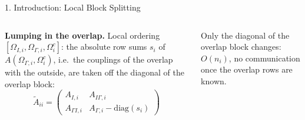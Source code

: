 \documentclass[aspectratio=169,10pt]{beamer}
\newcommand{\At}{\widetilde{A}}
\begin{document}
\begin{frame}{1. Introduction: Local Block Splitting}
  \small
  \begin{columns}[c,onlytextwidth]
    \setlength{\parskip}{3pt}
    \textbf{\color{schwarz}Lumping in the overlap.} Local ordering $[\Omega_{I,i},\Omega_{\Gamma,i},\Omega^c_i]$:
    the absolute row sums $s_i$ of $A(\Omega_{\Gamma,i},\Omega^c_i)$, i.e.\ the couplings of the overlap with the
    \alert{outside}, are taken off the diagonal of the overlap block:
    \vspace{-1mm}
    \[
      \At_{ii}=\begin{pmatrix} A_{I,i} & A_{I\Gamma,i}\\ A_{\Gamma I,i} & A_{\Gamma,i}-\mathrm{diag}(s_i)\end{pmatrix}
    \]
    \vspace{-3mm}

    Only the \alert{diagonal of the overlap block} changes: $O(n_i)$, no communication
    once the overlap rows are known.


\end{columns}
\end{frame}
\end{document}
